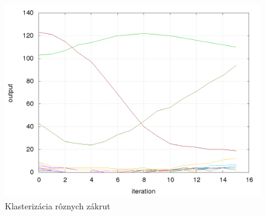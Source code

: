 \begin{figure}[!htb]
\center
\includegraphics[scale=.4]{../pictures/motoko_curves.png}
\caption{Klasterizácia rôznych zákrut}
\label{img:motoko_kohonen}
\end{figure}
